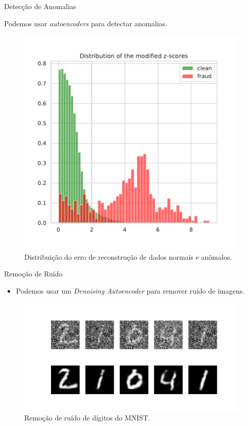 \documentclass[dvipsnames]{beamer}
\begin{document}
\begin{frame}{Detecção de Anomalias}

	Podemos usar \emph{autoencoders} para detectar anomalias.

	\begin{figure}
		\centering
		\includegraphics[scale=0.4]{img/anomaly.pdf}
        \caption{Distribuição do erro de reconstrução de dados normais e anômalos.}
	\end{figure}

\end{frame}

\begin{frame}{Remoção de Ruído}

    \begin{itemize}
        \item Podemos usar um \emph{Denoising Autoencoder} para remover ruído de imagens.
    \end{itemize}

    \begin{figure}
        \centering
        \includegraphics[scale=0.22]{img/denoising.pdf}
        \caption{Remoção de ruído de dígitos do MNIST.}
    \end{figure}

\end{frame}
\end{document}
